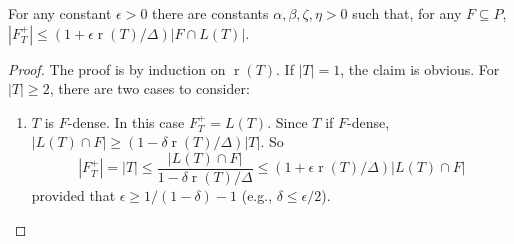 \documentclass{patmorin}
\DeclareMathOperator{\rank}{r}
\begin{document}
\begin{clm}
   For any constant $\epsilon>0$ there are constants $\alpha,\beta,\zeta,\eta >0$ such that, for any $F\subseteq P$,  $|F^+_T| \le (1+\epsilon\rank(T)/\Delta)|F\cap L(T)|$.
\end{clm}

\begin{proof}
  The proof is by induction on $\rank(T)$. If $|T|=1$, the claim is
  obvious. For $|T|\ge 2$, there are two cases to consider:
  \begin{enumerate}
    \item $T$ is $F$-dense. In this case $F^+_T=L(T)$.  
     Since $T$ if $F$-dense,  $|L(T)\cap F|\ge
     (1-\delta\rank(T)/\Delta)|T|$.  So
     \[
       |F^+_T|=|T|
	  \le \frac{|L(T)\cap F|}{1-\delta\rank(T)/\Delta} 
          \le (1+\epsilon\rank(T)/\Delta)|L(T)\cap F|
     \]
     provided that $\epsilon \ge 1/(1-\delta)-1$ (e.g., $\delta\le \epsilon/2$).


\end{enumerate}
\end{proof}
\end{document}
